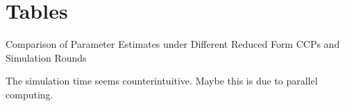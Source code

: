 \documentclass[12pt]{article}[margin=1in]
\begin{document}



\appendix
\section{Tables}
\begin{table}[!htbp]
    \centering
    
    \caption{Comparison of Parameter Estimates under Different Reduced Form CCPs and Simulation Rounds}
    \label{tab:comparison}
\end{table}
The simulation time seems counterintuitive. Maybe this is due to parallel computing.
\end{document}
